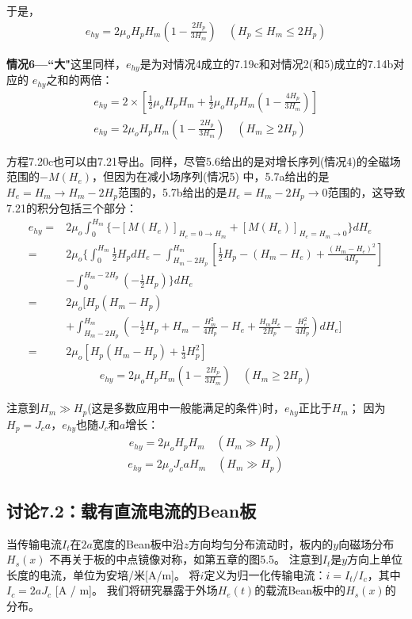 于是，
\begin{align*}
e_{hy}=2\mu_oH_pH_m\left(1-\frac{2H_p}{3H_m}\right)\quad (H_p\leq H_m\leq 2H_p) \tag{7.20b}
\end{align*}

\textbf{情况6---``大"}\quad 这里同样，$e_{hy}$是为对情况4成立的7.19c和对情况2(和5)成立的7.14b对应的
$e_{hy}$之和的两倍：
\begin{align*}%
e_{hy}=2\times\left[\frac{1}{2}\mu_oH_pH_m+\frac{1}{2}\mu_oH_pH_m\left(1-\frac{4H_p}{3H_m}\right)\right]\\
e_{hy}=2\mu_oH_pH_m\left(1-\frac{2H_p}{3H_m}\right) \quad (H_m\geq 2H_p) \tag{7.20c}
\end{align*}

方程7.20c也可以由7.21导出。同样，尽管5.6给出的是对增长序列(情况4)的全磁场范围的$-M(H_e)$，但因为在减小场序列(情况5)
中，5.7a给出的是$H_e=H_m\rightarrow H_m-2H_p$范围的，5.7b给出的是$H_e=H_m-2H_p\rightarrow 0$范围的，这导致
7.21的积分包括三个部分：
\begin{align*}%
e_{hy}=&2\mu_o\int_{0}^{H_m}\{-[M(H_e)]_{H_e=0\rightarrow H_m}+[M(H_e)]_{H_e=H_m\rightarrow 0}\}dH_e \\\tag{7.21}
=&2\mu_o\Big\{\int_{0}^{H_m}\frac{1}{2}H_pdH_e 
-\int_{H_m-2H_p}^{H_m}\left[\frac{1}{2}H_p-(H_m-H_e)+\frac{(H_m-H_e)^2}{4H_p}\right]\\
&-\int_{0}^{H_m-2H_p}(-\frac{1}{2}H_p)\Big\}dH_e\\ 
=&2\mu_o\big[H_p(H_m-H_p)\\ 
&+\int_{H_m-2H_p}^{H_m}\left(-\frac{1}{2}H_p+H_m-\frac{H_{m}^{2}}{4H_p}-H_e+\frac{H_mH_e}{2H_p}-\frac{H_{e}^{2}}{4H_p}\right)dH_e\big] \\
=&2\mu_o[H_p(H_m-H_p)+\frac{1}{3}H_{p}^{2}]
\end{align*}
\begin{align*}
e_{hy}=2\mu_oH_pH_m\left(1-\frac{2H_p}{3H_m}\right)   \quad  (H_m\geq 2H_p) \tag{7.20c}
\end{align*}

注意到$H_m\gg H_p$(这是多数应用中一般能满足的条件)时，$e_{hy}$正比于$H_m$；
因为$H_p=J_c a$，$e_{hy}$也随$J_c$和$a$增长：
\begin{align*}%
e_{hy}=2\mu_oH_pH_m \quad  (H_m\gg H_p) \tag{7.20d}
\end{align*}
\begin{align*}
e_{hy}=2\mu_oJ_caH_m \quad (H_m\gg H_p) \tag{7.20e}
\end{align*}


\subsection{讨论7.2：载有直流电流的Bean板}
当传输电流$I_t$在$2a$宽度的Bean板中沿$z$方向均匀分布流动时，板内的$y$向磁场分布$H_s(x)$
不再关于板的中点镜像对称，如第五章的图5.5。
注意到$I_t$是$y$方向上单位长度的电流，单位为安培/米[A/m]。
将$i$定义为归一化传输电流：$i= I_t / I_c$，其中$I_c = 2a J_c$ [A / m]。 我们将研究暴露于外场$H_e(t)$的载流Bean板中的$H_s(x)$的分布。

